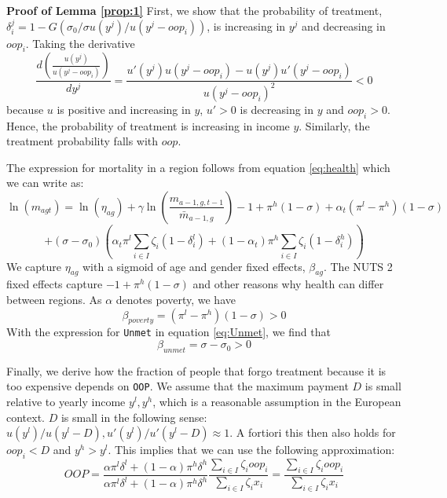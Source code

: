 \documentclass[a4paper,12pt]{article}
\begin{document}
\textbf{Proof of Lemma \ref{prop:1}}
First, we show that the probability of treatment, \(\delta_i^j = 1-G(\sigma_0/\sigma u(y^j)/u(y^j-oop_{i}))\), is increasing in \(y^j\) and decreasing in \(oop_{i}\). Taking the derivative
\begin{equation}
\label{eq:treatment_y}
\frac{d \left( \frac{u(y^{j})}{u(y^{j}-oop_{i})} \right)}{dy^j} = \frac{u'(y^{j})u(y^j-oop_{i}) - u(y^{j})u'(y^{j}-oop_{i})}{u(y^j-oop_{i})^2} < 0
\end{equation}
because \(u\) is positive and increasing in \(y\), \(u'>0\) is decreasing in \(y\) and \(oop_{i} >0\). Hence, the probability of treatment is increasing in income \(y\). Similarly, the treatment probability falls with \(oop\).

The expression for mortality in a region follows from equation \eqref{eq:health} which we can write as:
\begin{equation}
\ln(m_{agt}) = \ln({\eta}_{ag}) + \gamma \ln \left( \frac{m_{a-1,g,t-1}}{\bar m_{a-1,g}}\right)- 1+\pi^h(1-\sigma) + \alpha_t (\pi^l-\pi^h)(1-\sigma)
 \end{equation}
\begin{equation*}
+ (\sigma-\sigma_0) (\alpha_t \pi^l \sum_{i \in I} \zeta_i (1-\delta_i^l) + (1-\alpha_t) \pi^h \sum_{i \in I} \zeta_i(1-\delta_i^h))
\end{equation*}
We capture \({\eta}_{ag}\) with a sigmoid of age and gender fixed effects, \(\beta_{ag}\). The NUTS 2 fixed effects capture \(-1+\pi^h (1-\sigma)\) and other reasons why health can differ between regions. As \(\alpha\) denotes poverty, we have
\begin{equation}
\beta_{poverty} = (\pi^l-\pi^h)(1-\sigma) > 0
\end{equation}
With the expression for \texttt{Unmet} in equation \eqref{eq:Unmet}, we find that
\begin{equation}
\beta_{unmet} = \sigma-\sigma_0 > 0
\end{equation}

Finally, we derive how the fraction of people that forgo treatment because it is too expensive depends on \texttt{OOP}. We assume that the maximum payment \(D\) is small relative to yearly income \(y^l,y^h\), which is a reasonable assumption in the European context. \(D\) is small in the following sense: \(u(y^l)/u(y^l-D),u'(y^l)/u'(y^l-D) \approx 1\). A fortiori this then also holds for \(oop_i < D\) and \(y^h > y^l\). This implies that we can use the following approximation:
\begin{equation}
\label{eq:OOP-approx}
OOP = \frac{\alpha \pi^{l} \delta^{l} + (1-\alpha) \pi^{h} \delta^h}{\alpha \pi^{l} \delta^{l} + (1-\alpha) \pi^{h} \delta^h} \frac{\sum_{i \in I} \zeta_{i} oop_{i}}{\sum_{i \in I} \zeta_{i} x_i} = \frac{\sum_{i \in I} \zeta_{i} oop_{i}}{\sum_{i \in I} \zeta_{i} x_i}
\end{equation}
\end{document}
